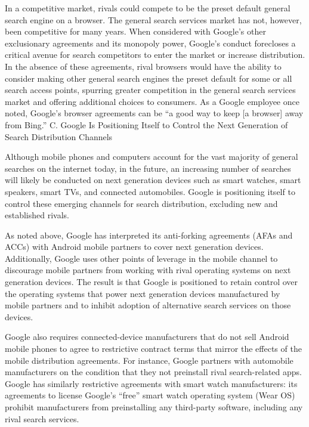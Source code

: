 \documentclass[11pt,b5paper]{scrartcl}
\begin{document}

In a competitive market, rivals could compete to be the preset default general
search engine on a browser. The general search services market has not, however, been
competitive for many years. When considered with Google’s other exclusionary agreements and
its monopoly power, Google’s conduct forecloses a critical avenue for search competitors to
enter the market or increase distribution. In the absence of these agreements, rival browsers
would have the ability to consider making other general search engines the preset default for
some or all search access points, spurring greater competition in the general search services
market and offering additional choices to consumers. As a Google employee once noted,
Google’s browser agreements can be “a good way to keep [a browser] away from Bing.”
C.
Google Is Positioning Itself to Control the Next Generation of Search
Distribution Channels


Although mobile phones and computers account for the vast majority of general
searches on the internet today, in the future, an increasing number of searches will likely be
conducted on next generation devices such as smart watches, smart speakers, smart TVs, and
connected automobiles. Google is positioning itself to control these emerging channels for search
distribution, excluding new and established rivals.


As noted above, Google has interpreted its anti-forking agreements (AFAs and
ACCs) with Android mobile partners to cover next generation devices. Additionally, Google
uses other points of leverage in the mobile channel to discourage mobile partners from working
with rival operating systems on next generation devices. The result is that Google is positioned to
retain control over the operating systems that power next generation devices manufactured by
mobile partners and to inhibit adoption of alternative search services on those devices.


Google also requires connected-device manufacturers that do not sell Android
mobile phones to agree to restrictive contract terms that mirror the effects of the mobile
distribution agreements. For instance, Google partners with automobile manufacturers on the
condition that they not preinstall rival search-related apps. Google has similarly restrictive
agreements with smart watch manufacturers: its agreements to license Google’s “free” smart
watch operating system (Wear OS) prohibit manufacturers from preinstalling any third-party
software, including any rival search services.
\end{document}
